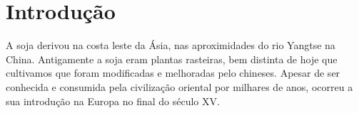 \documentclass[
	12pt,				%
	openright,			%
	oneside,      %
	a4paper,			%
	english,			%
	french,				%
	spanish,			%
	brazil,				%
	]{abntex2}\usepackage[]{graphicx}\usepackage[table]{xcolor}
\theoremstyle{definition}
\theoremstyle{remark}
\begin{document}
\listoffigures*
\cleardoublepage

\listoftables*
\cleardoublepage


  

\tableofcontents*
\cleardoublepage

\textual

\chapter[Introdução]{Introdução}



A soja derivou na costa leste da Ásia, nas aproximidades do rio Yangtse na China. Antigamente a soja eram plantas rasteiras, bem distinta de hoje que cultivamos que foram modificadas e melhoradas pelo chineses. Apesar de ser conhecida e consumida pela civilização oriental por milhares de anos, ocorreu a sua introdução na Europa no final do século XV. 
\end{document}
